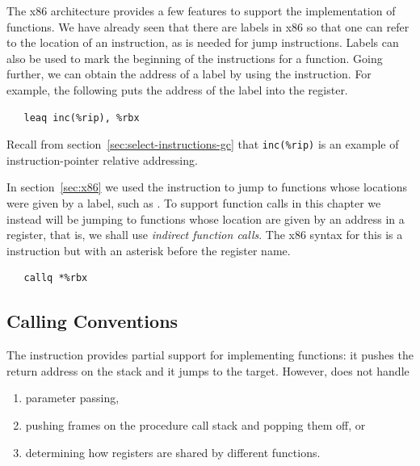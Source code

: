 \documentclass[7x10]{TimesAPriori_MIT}%
\numberwithin{theorem}{chapter}
\numberwithin{definition}{chapter}
\numberwithin{equation}{chapter}
\begin{document}


The x86 architecture provides a few features to support the
implementation of functions. We have already seen that there are
labels in x86 so that one can refer to the location of an instruction,
as is needed for jump instructions. Labels can also be used to mark
the beginning of the instructions for a function.  Going further, we
can obtain the address of a label by using the 
instruction. For example, the following puts the address of the
 label into the  register.
\begin{lstlisting}
   leaq inc(%rip), %rbx
\end{lstlisting}
Recall from section~\ref{sec:select-instructions-gc} that
\verb!inc(%rip)! is an example of instruction-pointer relative
addressing.

In section~\ref{sec:x86} we used the  instruction to jump
to functions whose locations were given by a label, such as
. To support function calls in this chapter we instead
will be jumping to functions whose location are given by an address in
a register, that is, we shall use \emph{indirect function calls}. The
x86 syntax for this is a  instruction but with an asterisk
before the register name.
\begin{lstlisting}
   callq *%rbx
\end{lstlisting}


\subsection{Calling Conventions}
\label{sec:calling-conventions-fun}


The  instruction provides partial support for implementing
functions: it pushes the return address on the stack and it jumps to
the target. However,  does not handle
\begin{enumerate}
\item parameter passing,
\item pushing frames on the procedure call stack and popping them off,
  or
\item determining how registers are shared by different functions.
\end{enumerate}
\end{document}
